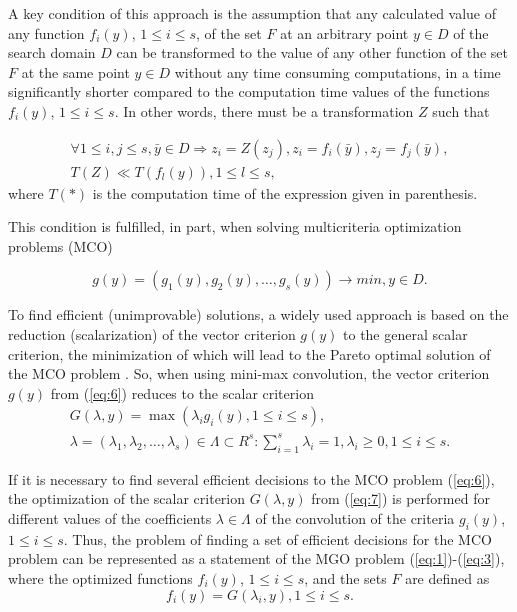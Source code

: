 \documentclass[review]{elsarticle}
\begin{document}
A key condition of this approach is the assumption that any calculated value of any function $f_i(y)$, $1 \leq i \leq s$, of the set $F$ at an arbitrary point $y \in D$ of the search domain $D$ can be transformed to the value of any other function of the set $F$ at the same point $y \in D$ without any time consuming computations, in a time significantly shorter compared to the computation time values of the functions $f_i(y)$, $1 \leq i \leq s$. In other words, there must be a transformation $Z$ such that

\begin{equation}\label{eq:5}
\begin{matrix}
\forall 1 \leq i, j \leq s, \bar{y} \in D \Rightarrow z_i=Z(z_j ), z_i = f_i (\bar{y}),z_j=f_j (\bar{y}), \\
T(Z) \ll T(f_l (y) ),1 \leq l \leq s,
\end{matrix}
\end{equation}
where $T(*)$ is the computation time of the expression given in parenthesis.

This condition is fulfilled, in part, when solving multicriteria optimization problems (MCO)

\begin{equation}\label{eq:6}
g(y) = (g_1(y), g_2(y), \dots , g_s(y)) \to min,  y\in D.
\end{equation}

To find efficient (unimprovable) solutions, a widely used approach is based on the reduction (scalarization) of the vector criterion $g(y)$ to the general scalar criterion, the minimization of which will lead to the Pareto optimal solution of the MCO problem \cite{c19,c20}. So, when using mini-max convolution, the vector criterion $g(y)$ from (\ref{eq:6}) reduces to the scalar criterion
\begin{equation}\label{eq:7}
\begin{matrix}
G(\lambda,y)=\max{(\lambda_i g_i(y),1 \leq i \leq s)},	\\
\lambda=(\lambda_1,\lambda_2,\dots,\lambda_s)\in \Lambda \subset R^s:\sum_{i=1}^s{\lambda_i =1},\lambda_i\geq 0,1 \leq i \leq s.
\end{matrix}
\end{equation}

If it is necessary to find several efficient decisions to the MCO problem (\ref{eq:6}), the optimization of the scalar criterion $G(\lambda,y)$ from (\ref{eq:7}) is performed for different values of the coefficients $\lambda \in \Lambda$ of the convolution of the criteria $g_i(y)$, $1 \leq i \leq s$. Thus, the problem of finding a set of efficient decisions for the MCO problem can be represented as a statement of the MGO problem (\ref{eq:1})-(\ref{eq:3}), where the optimized functions $f_i(y)$, $1 \leq i \leq s$, and the sets $F$ are defined as
\begin{equation}\label{eq:8}
f_i (y)= G(\lambda_i,y),1 \leq i \leq s.
\end{equation}
\end{document}
